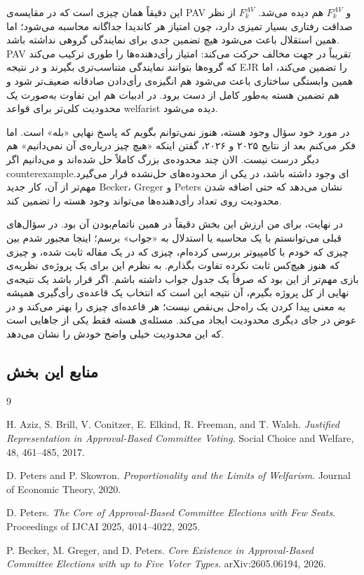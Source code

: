 \documentclass[12pt, a4paper]{article}
\begin{document}
این دقیقاً همان چیزی است که در مقایسه‌ی PAV و $F_k^{AV}$ هم دیده می‌شد. $F_k^{AV}$ از نظر صداقت رفتاری بسیار تمیزی دارد، چون امتیاز هر کاندیدا جداگانه محاسبه می‌شود؛ اما همین استقلال باعث می‌شود هیچ تضمین جدی برای نمایندگی گروهی نداشته باشد. PAV تقریباً در جهت مخالف حرکت می‌کند: امتیاز رأی‌دهنده‌ها را طوری ترکیب می‌کند که گروه‌ها بتوانند نمایندگی متناسب‌تری بگیرند و در نتیجه EJR را تضمین می‌کند، اما همین وابستگی ساختاری باعث می‌شود هم انگیزه‌ی رأی‌دادن صادقانه ضعیف‌تر شود و هم تضمین هسته به‌طور کامل از دست برود. در ادبیات هم این تفاوت به‌صورت یک محدودیت کلی‌تر برای قواعد welfarist دیده می‌شود. \cite{peters2020welfarism}

در مورد خود سؤال وجود هسته، هنوز نمی‌توانم بگویم که پاسخ نهایی «بله» است. اما فکر می‌کنم بعد از نتایج ۲۰۲۵ و ۲۰۲۶، گفتن اینکه «هیچ چیز درباره‌ی آن نمی‌دانیم» هم دیگر درست نیست. الان چند محدوده‌ی بزرگ کاملاً حل شده‌اند و می‌دانیم اگر counterexampleای وجود داشته باشد، در یکی از محدوده‌های حل‌نشده قرار می‌گیرد. مهم‌تر از آن، کار جدید Becker، Greger و Peters نشان می‌دهد که حتی اضافه شدن محدودیت روی تعداد رأی‌دهنده‌ها می‌تواند وجود هسته را تضمین کند. \cite{becker2026core}

در نهایت، برای من ارزش این بخش دقیقاً در همین ناتمام‌بودن آن بود. در سؤال‌های قبلی می‌توانستم با یک محاسبه یا استدلال به «جواب» برسم؛ اینجا مجبور شدم بین چیزی که خودم با کامپیوتر بررسی کرده‌ام، چیزی که در یک مقاله ثابت شده، و چیزی که هنوز هیچ‌کس ثابت نکرده تفاوت بگذارم. به نظرم این برای یک پروژه‌ی نظریه‌ی بازی مهم‌تر از این بود که صرفاً یک جدول جواب داشته باشم. اگر قرار باشد یک نتیجه‌ی نهایی از کل پروژه بگیرم، آن نتیجه این است که انتخاب یک قاعده‌ی رأی‌گیری همیشه به معنی پیدا کردن یک راه‌حل بی‌نقص نیست؛ هر قاعده‌ای چیزی را بهتر می‌کند و در عوض در جای دیگری محدودیت ایجاد می‌کند. مسئله‌ی هسته فقط یکی از جاهایی است که این محدودیت خیلی واضح خودش را نشان می‌دهد.

\subsection*{منابع این بخش}

\begin{thebibliography}{9}

H. Aziz, S. Brill, V. Conitzer, E. Elkind, R. Freeman, and T. Walsh.
\newblock \emph{Justified Representation in Approval-Based Committee Voting}.
\newblock Social Choice and Welfare, 48, 461--485, 2017.

D. Peters and P. Skowron.
\newblock \emph{Proportionality and the Limits of Welfarism}.
\newblock Journal of Economic Theory, 2020.

D. Peters.
\newblock \emph{The Core of Approval-Based Committee Elections with Few Seats}.
\newblock Proceedings of IJCAI 2025, 4014--4022, 2025.

P. Becker, M. Greger, and D. Peters.
\newblock \emph{Core Existence in Approval-Based Committee Elections with up to Five Voter Types}.
\newblock arXiv:2605.06194, 2026.

\end{thebibliography}
\end{document}
